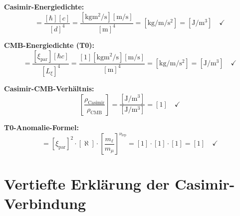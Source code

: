 \documentclass[12pt,a4paper]{article}
\theoremstyle{remark}
\begin{document}
	\textbf{Casimir-Energiedichte:}
	\begin{equation}
		[\rho_{\text{Casimir}}] = \frac{[\hbar][c]}{[d]^4} = \frac{[\si{\kilogram\metre\squared\per\second}][\si{\metre\per\second}]}{[\si{\metre}]^4} = [\si{\kilogram\per\metre\per\second\squared}] = [\si{\joule\per\cubic\metre}] \quad \checkmark
	\end{equation}
	
	\textbf{CMB-Energiedichte (T0):}
	\begin{equation}
		[\rho_{\text{CMB}}] = \frac{[\xi_{\text{par}}][\hbar c]}{[L_{\xi}]^4} = \frac{[\text{1}][\si{\kilogram\metre\squared\per\second}][\si{\metre\per\second}]}{[\si{\metre}]^4} = [\si{\kilogram\per\metre\per\second\squared}] = [\si{\joule\per\cubic\metre}] \quad \checkmark
	\end{equation}
	
	\textbf{Casimir-CMB-Verhältnis:}
	\begin{equation}
		\left[\frac{\rho_{\text{Casimir}}}{\rho_{\text{CMB}}}\right] = \frac{[\si{\joule\per\cubic\metre}]}{[\si{\joule\per\cubic\metre}]} = [\text{1}] \quad \checkmark
	\end{equation}
	
	\textbf{T0-Anomalie-Formel:}
	\begin{equation}
		[a_\ell] = [\xi_{\text{par}}]^2 \cdot [\aleph] \cdot \left[\frac{m_\ell}{m_\mu}\right]^{\nu_{\text{lep}}} = [\text{1}] \cdot [\text{1}] \cdot [\text{1}] = [\text{1}] \quad \checkmark
	\end{equation}
	
\section{Vertiefte Erklärung der Casimir-Verbindung}
\end{document}
